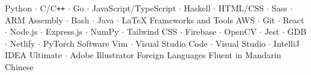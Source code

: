 

\begin{cvskills}
	{Python $\cdot$ C/C\texttt{++} $\cdot$ Go $\cdot$ JavaScript/TypeScript $\cdot$ Haskell $\cdot$ HTML/CSS $\cdot$ Sass $\cdot$ ARM Assembly $\cdot$ Bash $\cdot$ Java $\cdot$ \LaTeX}
	\cvskill
	{Frameworks and Tools}
	{AWS $\cdot$ Git $\cdot$ React $\cdot$ Node.js $\cdot$ Express.js $\cdot$ NumPy $\cdot$ Tailwind CSS $\cdot$ Firebase $\cdot$ OpenCV $\cdot$ Jest $\cdot$ GDB $\cdot$ Netlify $\cdot$ PyTorch}
	\cvskill
	{Software}
	{Vim $\cdot$ Visual Studio Code $\cdot$ Visual Studio $\cdot$ IntelliJ IDEA Ultimate $\cdot$ Adobe Illustrator} 
	\cvskill
	{Foreign Languages}
	{Fluent in Mandarin Chinese}
\end{cvskills}